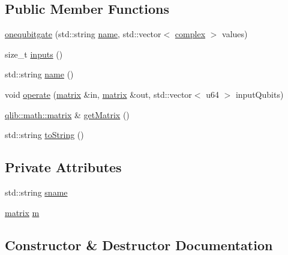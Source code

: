 \subsection*{Public Member Functions}
\begin{DoxyCompactItemize}
\item 
\hyperlink{classqlib_1_1quantum_1_1gates_1_1onequbitgate_a587ebdfa032f58bf63433c89c6015149}{onequbitgate} (std\+::string \hyperlink{classqlib_1_1quantum_1_1gates_1_1onequbitgate_aacf3878010f0c1327bae4dcc7faf4c92}{name}, std\+::vector$<$ \hyperlink{classqlib_1_1math_1_1complex}{complex} $>$ values)
\item 
size\+\_\+t \hyperlink{classqlib_1_1quantum_1_1gates_1_1onequbitgate_a050ed71ebff89050c3123124f8ba8719}{inputs} ()
\item 
std\+::string \hyperlink{classqlib_1_1quantum_1_1gates_1_1onequbitgate_aacf3878010f0c1327bae4dcc7faf4c92}{name} ()
\item 
void \hyperlink{classqlib_1_1quantum_1_1gates_1_1onequbitgate_a280c7a7d29032eeb95afcb3d6668e7db}{operate} (\hyperlink{classqlib_1_1math_1_1matrix}{matrix} \&in, \hyperlink{classqlib_1_1math_1_1matrix}{matrix} \&out, std\+::vector$<$ u64 $>$ input\+Qubits)
\item 
\hyperlink{classqlib_1_1math_1_1matrix}{qlib\+::math\+::matrix} \& \hyperlink{classqlib_1_1quantum_1_1gates_1_1onequbitgate_a39490c6d1dcc94dc82bb7345fe984278}{get\+Matrix} ()
\item 
std\+::string \hyperlink{classqlib_1_1quantum_1_1gates_1_1onequbitgate_a38af1af0f466add047c3e75780e28c80}{to\+String} ()
\end{DoxyCompactItemize}
\subsection*{Private Attributes}
\begin{DoxyCompactItemize}
\item 
std\+::string \hyperlink{classqlib_1_1quantum_1_1gates_1_1onequbitgate_abc5ac874b8a4174cc72a159d3c6d91d2}{sname}
\item 
\hyperlink{classqlib_1_1math_1_1matrix}{matrix} \hyperlink{classqlib_1_1quantum_1_1gates_1_1onequbitgate_a6d935a1219c646b16c136560a5b4f0bf}{m}
\end{DoxyCompactItemize}


\subsection{Constructor \& Destructor Documentation}
